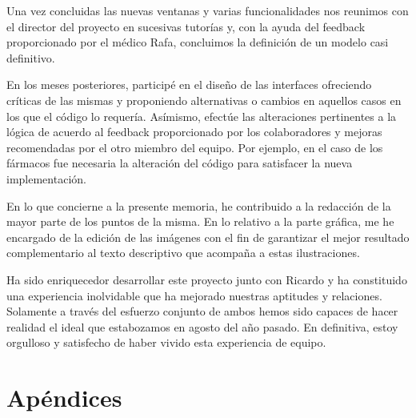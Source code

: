 \documentclass[11pt,spanish,
		listoftables,listoffigures]
		{tfgplantilla}
\begin{document}
Una vez concluidas las nuevas ventanas y varias funcionalidades nos reunimos con el director del proyecto en sucesivas tutorías y, con la ayuda del feedback proporcionado por el médico Rafa, concluimos la definición de un modelo casi definitivo. 

En los meses posteriores, participé en el diseño de las interfaces ofreciendo críticas de las mismas y proponiendo alternativas o cambios en aquellos casos en los que el código lo requería. Asímismo, efectúe las alteraciones pertinentes a la lógica de acuerdo al feedback proporcionado por los colaboradores y mejoras recomendadas por el otro miembro del equipo. Por ejemplo, en el caso de los fármacos fue necesaria la alteración del código para satisfacer la nueva implementación.

En lo que concierne a la presente memoria, he contribuido a la redacción de la mayor parte de los puntos de la misma. En lo relativo a la parte gráfica, me he encargado de la edición de las imágenes con el fin de garantizar el mejor resultado complementario al texto descriptivo que acompaña a estas ilustraciones.

Ha sido enriquecedor desarrollar este proyecto junto con Ricardo y ha constituido una experiencia inolvidable que ha mejorado nuestras aptitudes y relaciones. Solamente a través del esfuerzo conjunto de ambos hemos sido capaces de hacer realidad el ideal que estabozamos en agosto del año pasado. En definitiva, estoy orgulloso y satisfecho de haber vivido esta experiencia de equipo.

\cleardoublepage


\chapter{Apéndices}


\end{document}
